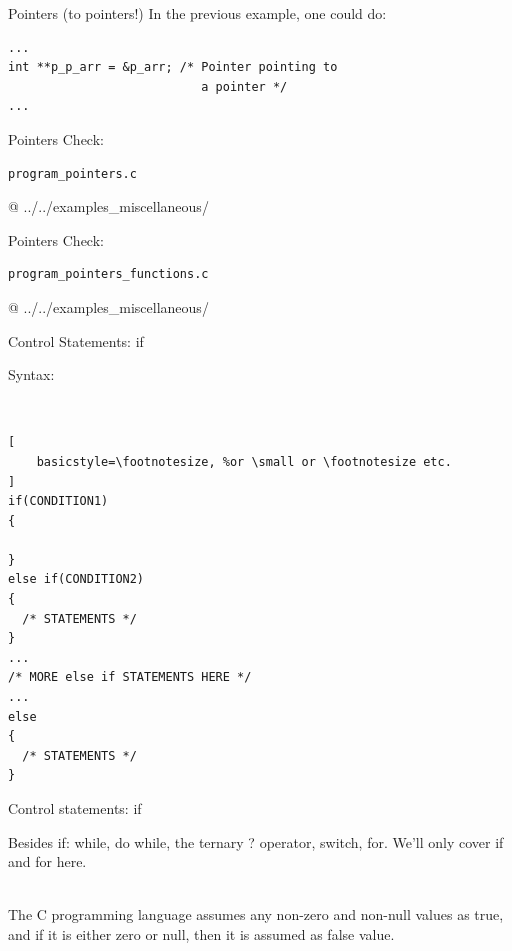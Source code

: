 \documentclass[10pt]{beamer}
\begin{document}
\begin{frame}[fragile]{Pointers (to pointers!)}
In the previous example, one could do:

\begin{lstlisting}
...
int **p_p_arr = &p_arr; /* Pointer pointing to
                           a pointer */
...
\end{lstlisting}
\end{frame}


\begin{frame}[fragile]{Pointers}
Check:

\begin{lstlisting}
program_pointers.c
\end{lstlisting}

@ ../../examples\_miscellaneous/
\end{frame}


\begin{frame}[fragile]{Pointers}
Check:
\begin{lstlisting}
program_pointers_functions.c
\end{lstlisting}

@ ../../examples\_miscellaneous/
\end{frame}


\begin{frame}[fragile]{Control Statements: if}

Syntax:

\ \\

\begin{lstlisting}[
    basicstyle=\footnotesize, %or \small or \footnotesize etc.
]
if(CONDITION1)
{
  
}
else if(CONDITION2)
{
  /* STATEMENTS */
}
...
/* MORE else if STATEMENTS HERE */
...
else
{
  /* STATEMENTS */
}
\end{lstlisting}
\end{frame}


\begin{frame}[fragile]{Control statements: if}

Besides if: while, do while, the ternary ? operator, switch, for. We'll only cover if and for here.

\ \\

The C programming language assumes any non-zero and non-null values as true, and if it is either zero or null, then it is assumed as false value.

\end{frame}
\end{document}

